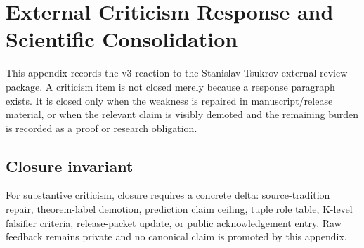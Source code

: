 \section{External Criticism Response and Scientific Consolidation}
\label{sec:oc13-external-criticism-closure}

This appendix records the v3 reaction to the Stanislav Tsukrov external review package. A criticism item is not closed merely because a response paragraph exists. It is closed only when the weakness is repaired in manuscript/release material, or when the relevant claim is visibly demoted and the remaining burden is recorded as a proof or research obligation.

\subsection{Closure invariant}

For substantive criticism, closure requires a concrete delta: source-tradition repair, theorem-label demotion, prediction claim ceiling, tuple role table, K-level falsifier criteria, release-packet update, or public acknowledgement entry. Raw feedback remains private and no canonical claim is promoted by this appendix.

